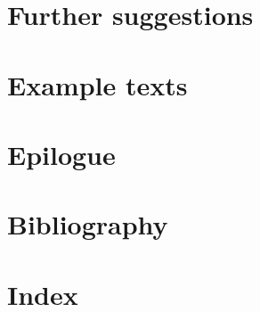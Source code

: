 \documentclass[ twoside, openany, 12pt, a5paper]{book}
\begin{document}
\chapter{Further suggestions}

\chapter{Example texts}

\backmatter

\chapter{Epilogue}

\chapter{Bibliography}

\chapter{Index}


\end{document}

